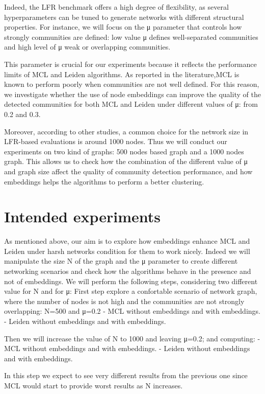 \documentclass[a4paper,11pt]{article}
\begin{document}
Indeed, the LFR benchmark offers a high degree of flexibility, as several hyperparameters can be tuned to generate networks with different structural properties.
For instance, we will focus on the μ parameter that controls how strongly communities are defined: low value μ defines well-separated communities and high level of μ weak or overlapping communities.

This parameter is crucial for our experiments because it reflects the performance limits of MCL and Leiden algorithms. 
As reported in the literature,MCL is known to perform poorly when communities are not well defined. For this reason, we investigate whether the use of node embeddings 
can improve the quality of the detected communities for both MCL and Leiden under different values of μ: from 0.2 and 0.3.

Moreover, according to other studies, a common choice for the network size in LFR-based evaluations is around 1000 nodes. Thus we will conduct our experiments on two kind of graphs: 500 nodes 
based graph and a 1000 nodes graph.
This allows us to check how the combination of the different value of μ and graph size affect the quality of community detection performance, and how
embeddings helps the algorithms to perform a better clustering.



\section*{Intended experiments}
As mentioned above, our aim is to explore how embeddings enhance MCL and Leiden under harsh networks condition for them to work nicely. 
Indeed we will manipulate the size N of the graph and the μ parameter to create different networking scenarios and check how the algorithms behave in the presence and not of embeddings.
We will perform the following steps, considering two different value for N and for μ:
First step explore a confortable scenario of network graph, where the number of nodes is not high and the communities are not strongly overlapping: N=500 and μ=0.2
- MCL without embeddings and with embeddings.
- Leiden without embeddings and with embeddings.

Then we will increase the value of N to 1000 and leaving μ=0.2; and computing:
- MCL without embeddings and with embeddings.
- Leiden without embeddings and with embeddings.

In this step we expect to see very different results from the previous one since MCL would start to provide worst results as N increases.
\end{document}
